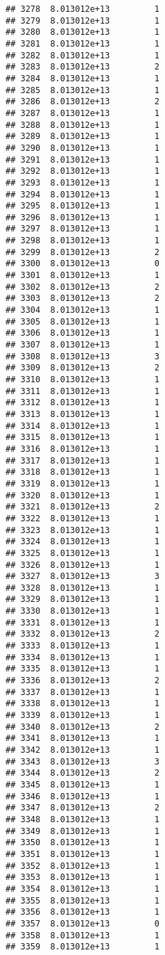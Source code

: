 \documentclass[
]{article}
\begin{document}
\begin{verbatim}
## 3278  8.013012e+13         1
## 3279  8.013012e+13         1
## 3280  8.013012e+13         1
## 3281  8.013012e+13         1
## 3282  8.013012e+13         1
## 3283  8.013012e+13         2
## 3284  8.013012e+13         1
## 3285  8.013012e+13         1
## 3286  8.013012e+13         2
## 3287  8.013012e+13         1
## 3288  8.013012e+13         1
## 3289  8.013012e+13         1
## 3290  8.013012e+13         1
## 3291  8.013012e+13         1
## 3292  8.013012e+13         1
## 3293  8.013012e+13         1
## 3294  8.013012e+13         1
## 3295  8.013012e+13         1
## 3296  8.013012e+13         1
## 3297  8.013012e+13         1
## 3298  8.013012e+13         1
## 3299  8.013012e+13         2
## 3300  8.013012e+13         0
## 3301  8.013012e+13         1
## 3302  8.013012e+13         2
## 3303  8.013012e+13         2
## 3304  8.013012e+13         1
## 3305  8.013012e+13         1
## 3306  8.013012e+13         1
## 3307  8.013012e+13         1
## 3308  8.013012e+13         3
## 3309  8.013012e+13         2
## 3310  8.013012e+13         1
## 3311  8.013012e+13         1
## 3312  8.013012e+13         1
## 3313  8.013012e+13         1
## 3314  8.013012e+13         1
## 3315  8.013012e+13         1
## 3316  8.013012e+13         1
## 3317  8.013012e+13         1
## 3318  8.013012e+13         1
## 3319  8.013012e+13         1
## 3320  8.013012e+13         1
## 3321  8.013012e+13         2
## 3322  8.013012e+13         1
## 3323  8.013012e+13         1
## 3324  8.013012e+13         1
## 3325  8.013012e+13         1
## 3326  8.013012e+13         1
## 3327  8.013012e+13         3
## 3328  8.013012e+13         1
## 3329  8.013012e+13         1
## 3330  8.013012e+13         1
## 3331  8.013012e+13         1
## 3332  8.013012e+13         2
## 3333  8.013012e+13         1
## 3334  8.013012e+13         1
## 3335  8.013012e+13         1
## 3336  8.013012e+13         2
## 3337  8.013012e+13         1
## 3338  8.013012e+13         1
## 3339  8.013012e+13         1
## 3340  8.013012e+13         2
## 3341  8.013012e+13         1
## 3342  8.013012e+13         1
## 3343  8.013012e+13         3
## 3344  8.013012e+13         2
## 3345  8.013012e+13         1
## 3346  8.013012e+13         1
## 3347  8.013012e+13         2
## 3348  8.013012e+13         1
## 3349  8.013012e+13         1
## 3350  8.013012e+13         1
## 3351  8.013012e+13         1
## 3352  8.013012e+13         1
## 3353  8.013012e+13         1
## 3354  8.013012e+13         1
## 3355  8.013012e+13         1
## 3356  8.013012e+13         1
## 3357  8.013012e+13         0
## 3358  8.013012e+13         1
## 3359  8.013012e+13         1

\end{verbatim}
\end{document}
